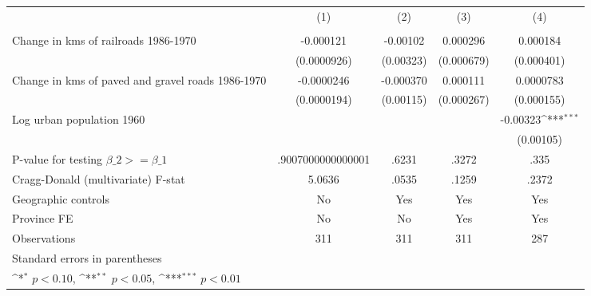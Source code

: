 {
\def\sym#1{\ifmmode^{#1}\else\(^{#1}\)\fi}
\begin{tabular}{l*{4}{c}}
\hline\hline
                &\multicolumn{1}{c}{(1)}&\multicolumn{1}{c}{(2)}&\multicolumn{1}{c}{(3)}&\multicolumn{1}{c}{(4)}\\
                &\multicolumn{1}{c}{}&\multicolumn{1}{c}{}&\multicolumn{1}{c}{}&\multicolumn{1}{c}{}\\
\hline
Change in kms of railroads 1986-1970&-0.000121         & -0.00102         & 0.000296         & 0.000184         \\
                &(0.0000926)         &(0.00323)         &(0.000679)         &(0.000401)         \\
[1em]
Change in kms of paved and gravel roads 1986-1970&-0.0000246         &-0.000370         & 0.000111         &0.0000783         \\
                &(0.0000194)         &(0.00115)         &(0.000267)         &(0.000155)         \\
[1em]
Log urban population 1960&                  &                  &                  & -0.00323\sym{***}\\
                &                  &                  &                  &(0.00105)         \\
\hline
P-value for testing $\beta\_{2} >= \beta\_{1}$&.9007000000000001         &    .6231         &    .3272         &     .335         \\
Cragg-Donald (multivariate) F-stat&   5.0636         &    .0535         &    .1259         &    .2372         \\
Geographic controls&       No         &      Yes         &      Yes         &      Yes         \\
Province FE     &       No         &       No         &      Yes         &      Yes         \\
Observations    &      311         &      311         &      311         &      287         \\
\hline\hline
\multicolumn{5}{l}{\footnotesize Standard errors in parentheses}\\
\multicolumn{5}{l}{\footnotesize \sym{*} \(p<0.10\), \sym{**} \(p<0.05\), \sym{***} \(p<0.01\)}\\
\end{tabular}
}
